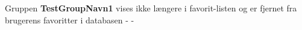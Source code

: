 			{Gruppen \textbf{TestGroupNavn1} vises ikke længere i favorit-listen og er fjernet fra brugerens favoritter i databasen}{ - }{ - }
